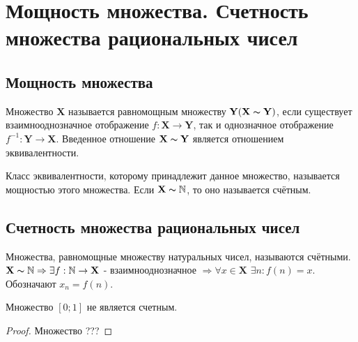 \section{Мощность множества. Счетность множества рациональных чисел}

\subsection{Мощность множества}

\begin{definition}
	Множество $\mathbf{X}$ называется равномощным множеству $\mathbf{Y} (\mathbf{X} \thicksim \mathbf{Y})$, если существует взаимнооднозначное отображение $f: \mathbf{X} \rightarrow \mathbf{Y}$, так и однозначное отображение $f^{-1}: \mathbf{Y} \rightarrow \mathbf{X}$. Введенное отношение $\mathbf{X} \thicksim \mathbf{Y}$ является отношением эквивалентности.
\end{definition}

\begin{definition}
	Класс эквивалентности, которому принадлежит данное множество, называется мощностью этого множества. Если $\mathbf{X} \thicksim \mathbb{N}$, то оно называется счётным.
\end{definition}

\subsection{Счетность множества рациональных чисел}

\begin{definition}
	Множества, равномощные множеству натуральных чисел, называются счётными. $\mathbf{X} \thicksim \mathbb{N} \Rightarrow \exists f: \mathbb{N} \rightarrow \mathbf{X}$ - взаимнооднозначное $\Rightarrow \forall x \in \mathbf{X}$ $ \exists n: f(n) = x$. Обозначают $x_n = f(n)$.
\end{definition}

\begin{theorem}
	Множество $[0; 1]$ не является счетным.
\end{theorem}

\begin{proof}
	Множество ???
\end{proof}